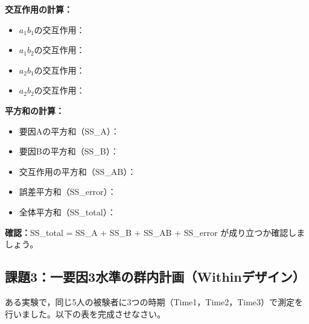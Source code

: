 \documentclass[a4paper,12pt]{ltjarticle}
\begin{document}
\textbf{交互作用の計算：}
\begin{itemize}
	\item[] $a_1b_1$の交互作用：\underline{\hspace{3cm}}
	\item[] $a_1b_2$の交互作用：\underline{\hspace{3cm}}
	\item[] $a_2b_1$の交互作用：\underline{\hspace{3cm}}
	\item[] $a_2b_2$の交互作用：\underline{\hspace{3cm}}
\end{itemize}

\textbf{平方和の計算：}
\begin{itemize}
	\item[] 要因Aの平方和（SS\_A）：\underline{\hspace{3cm}}
	\item[] 要因Bの平方和（SS\_B）：\underline{\hspace{3cm}}
	\item[] 交互作用の平方和（SS\_AB）：\underline{\hspace{3cm}}
	\item[] 誤差平方和（SS\_error）：\underline{\hspace{3cm}}
	\item[] 全体平方和（SS\_total）：\underline{\hspace{3cm}}
\end{itemize}

\textbf{確認：}SS\_total = SS\_A + SS\_B + SS\_AB + SS\_error が成り立つか確認しましょう。

\newpage

\subsection*{課題3：一要因3水準の群内計画（Withinデザイン）}

ある実験で，同じ5人の被験者に3つの時期（Time1，Time2，Time3）で測定を行いました。以下の表を完成させなさい。
\end{document}
